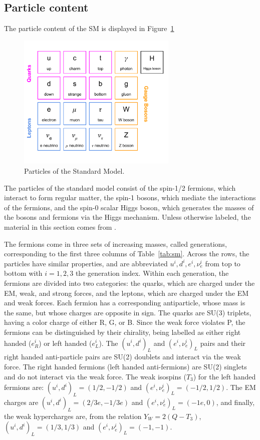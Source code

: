 \subsection{Particle content}

The particle content of the SM is displayed in Figure~\ref{fig:smparticles}

\begin{figure}[tbh]
\centering
\includegraphics[width=3in]{figures/smparticles.pdf}
\caption{Particles of the Standard Model.}
\label{fig:smparticles}
\end{figure}

The particles of the standard model consist of the spin-1/2 fermions, which interact to form regular matter, the spin-1 bosons, which mediate the interactions of the fermions, and the spin-0 scalar Higgs boson, which generates the masses of the bosons and fermions via the Higgs mechanism. Unless otherwise labeled, the material in this section comes from \cite{Bettini}.

\indent The fermions come in three sets of increasing masses, called generations, corresponding to the first three columns of Table~\ref{tab:sm}. Across the rows, the particles have similar properties, and are abbreviated $u^i, d^i, e^i, \nu_e^i$ from top to bottom with $i=1,2,3$ the generation index. Within each generation, the fermions are divided into two categories: the quarks, which are charged under the EM, weak, and strong forces, and the leptons, which are charged under the EM and weak forces. Each fermion has a corresponding antiparticle, whose mass is the same, but whose charges are opposite in sign. The quarks are SU(3) triplets, having a color charge of either R, G, or B. Since the weak force violates P, the fermions can be distinguished by their chirality, being labelled as either right handed ($e^i_R$) or left handed ($e^i_L$). The $(u^i, d^i)_L$ and $(e^i, \nu_e^i)_L$ pairs and their right handed anti-particle pairs are SU(2) doublets and interact via the weak force. The right handed fermions (left handed anti-fermions) are SU(2) singlets and do not interact via the weak force. The weak isospins ($T_3$) for the left handed fermions are: $(u^i, d^i)_L = (1/2, -1/2)$ and $(e^i, \nu_e^i)_L = (-1/2, 1/2)$. The EM charges are $(u^i, d^i)_L = (2/3e, -1/3e)$ and $(e^i, \nu_e^i)_L = (-1e, 0)$, and finally, the weak hypercharges are, from the relation $Y_W = 2(Q-T_3)$, $(u^i, d^i)_L = (1/3, 1/3)$ and $(e^i, \nu_e^i)_L = (-1, -1)$.


